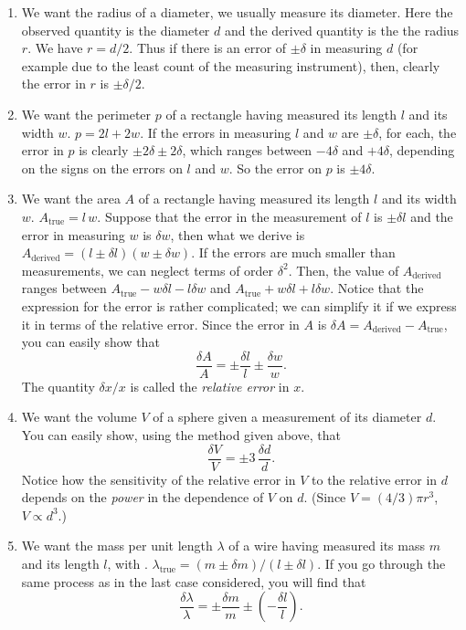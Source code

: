 \begin{enumerate}
    \item We want the radius of a diameter, we usually measure its diameter. Here the observed quantity is the diameter $d$ and the derived quantity is the the radius $r$. We have $r = d/2$. Thus if there is an error of $\pm \delta$ in measuring $d$ (for example due to the least count of the measuring instrument), then, clearly the error in $r$ is $\pm \delta/2$.
    
    \item We want the perimeter $p$ of a rectangle having measured its length $l$ and its width $w$. $p = 2l + 2w$. If the errors in measuring $l$ and $w$ are $\pm \delta$, for each, the error in $p$ is clearly $\pm 2 \delta \pm 2 \delta$, which ranges between $- 4 \delta$ and $+ 4\delta $, depending on the signs on the errors on $l$ and $w$. So the error on $p$ is $\pm 4 \delta$.
    
    \item We want the area $A$ of a rectangle having measured its length $l$ and its width $w$. $A_\text{true} = l \, w$. Suppose that the error in the measurement of $l$ is $\pm \delta l$ and the error in measuring $w$ is $\delta w$, then what we derive is $A_\text{derived} = (l \pm \delta l) (w \pm \delta w)$. If the errors are much smaller than measurements, we can neglect terms of order $\delta^2$. Then, the value of $A_\text{derived}$ ranges between $A_\text{true} - w \delta l - l \delta w$ and $A_\text{true} +  w \delta l + l \delta w$. Notice that the expression for the error is rather complicated; we can simplify it if we express it in terms of the relative error. Since the error in $A$ is $\delta A = A_\text{derived} - A_\text{true}$, you can easily show that 
    \begin{equation*}
        \frac{\delta A}{A} = \pm \frac{\delta l}{l} \pm \frac{\delta w}{w}.
    \end{equation*}
    The quantity $\delta x / x$ is called the \textit{relative error} in $x$.
    
    \item We want the volume $V$ of a sphere given a measurement of its diameter $d$. You can easily show, using the method given above, that 
\begin{equation*}
    \frac{\delta V}{V} = \pm 3 \, \frac{\delta d}{d}.
\end{equation*}
Notice how the sensitivity of the relative error in $V$ to the relative error in $d$ depends on the \textit{power} in the dependence of $V$ on $d$. (Since $V = (4/3) \pi r^3$, $V \propto d^3$.)
    
    \item We want the mass per unit length $\lambda$ of a wire having measured its mass $m$ and its length $l$, with . $\lambda_\text{true} = (m \pm \delta m) / (l \pm \delta l)$. If you go through the same process as in the last case considered, you will find that 
    \begin{equation*}
        \frac{\delta \lambda}{\lambda} = \pm \frac{\delta m}{m} \pm \left( -\frac{\delta l}{l} \right).
    \end{equation*}
    
\end{enumerate}

